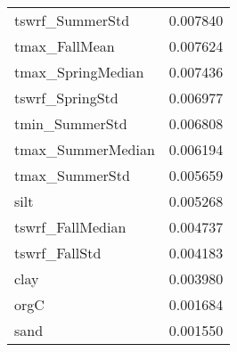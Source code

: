 \begin{tabular}{lr}
tswrf_SummerStd & 0.007840 \\
tmax_FallMean & 0.007624 \\
tmax_SpringMedian & 0.007436 \\
tswrf_SpringStd & 0.006977 \\
tmin_SummerStd & 0.006808 \\
tmax_SummerMedian & 0.006194 \\
tmax_SummerStd & 0.005659 \\
silt & 0.005268 \\
tswrf_FallMedian & 0.004737 \\
tswrf_FallStd & 0.004183 \\
clay & 0.003980 \\
orgC & 0.001684 \\
sand & 0.001550 \\
\bottomrule
\end{tabular}
